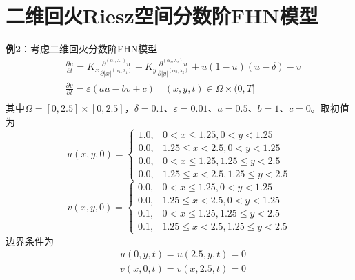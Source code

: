 \documentclass[twoside,UTF8]{nputhesis}
\begin{document}

\section{二维回火Riesz空间分数阶FHN模型}
\noindent   %
\textbf{例2}：考虑二维回火分数阶FHN模型
\[
\begin{split}
& \frac{\partial u}{\partial t}={{K}_{x}}\frac{{{\partial }^{({{\alpha }_{1}},{{\lambda }_{1}})}}u}{\partial {{\left| x \right|}^{({{\alpha }_{1}},{{\lambda }_{1}})}}}+{{K}_{y}}\frac{{{\partial }^{({{\alpha }_{2}},{{\lambda }_{2}})}}u}{\partial {{\left| y \right|}^{({{\alpha }_{2}},{{\lambda }_{2}})}}}+u(1-u)(u-\delta )-v \\
& \frac{\partial v}{\partial t}=\varepsilon (au-bv+c) \quad (x,y,t)\in \Omega \times (0,T] \\
\end{split}
\]	
其中$\Omega =[0,2.5]\times[0,2.5]$，$\delta =0.1$、$\varepsilon =0.01$、$a =0.5$、$b =1$、$c =0$。取初值为
\[u(x, y, 0)=\left\{\begin{array}{ll}{1.0,} & {0<x \leq 1.25,0<y<1.25} \\ {0.0,} & {1.25 \leq x<2.5,0<y<1.25} \\ {0.0,} & {0<x \leq 1.25,1.25 \leq y<2.5} \\ {0.0,} & {1.25 \leq x<2.5,1.25 \leq y<2.5}\end{array}\right.\]
\[v(x, y, 0)=\left\{\begin{array}{ll}{0.0,} & {0<x \leq 1.25,0<y<1.25} \\ {0.0,} & {1.25 \leq x<2.5,0<y<1.25} \\ {0.1,} & {0<x \leq 1.25,1.25 \leq y<2.5} \\ {0.1,} & {1.25 \leq x<2.5,1.25 \leq y<2.5}\end{array}\right.\]
边界条件为
\[
\begin{split}
& u\left( 0,y,t \right)=u\left( 2.5,y,t \right)=0 \\
& v\left( x,0,t \right)=v\left( x,2.5,t \right)=0 \\
\end{split}
\]
\end{document}
